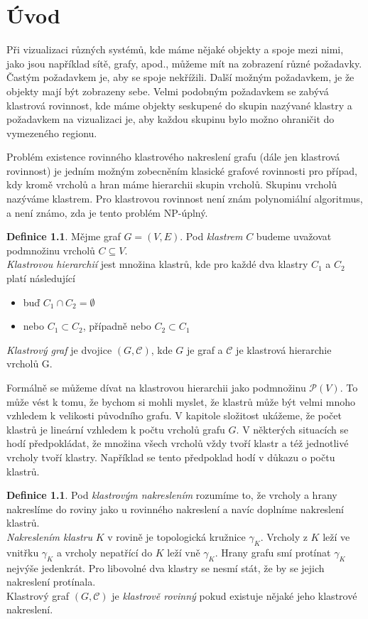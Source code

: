 \documentclass[12pt,a4report]{report}
\theoremstyle{definition}
\newtheorem{defn}[theorem]{Definice}
\begin{document}
\author{Filip Šedivý}

\chapter{Úvod}

Při vizualizaci různých systémů, kde máme nějaké objekty a spoje mezi nimi, jako jsou například sítě, grafy, apod., můžeme mít na zobrazení různé požadavky. Častým požadavkem je, aby se spoje nekřížili. Další možným požadavkem, je že objekty mají být zobrazeny  sebe. Velmi podobným požadavkem se zabývá klastrová rovinnost, kde máme objekty seskupené do skupin nazývané klastry a požadavkem na vizualizaci je, aby každou skupinu bylo možno ohraničit do vymezeného regionu.

Problém existence rovinného klastrového nakreslení grafu (dále jen klastrová rovinnost) je jedním možným zobecněním klasické grafové rovinnosti pro případ, kdy kromě vrcholů a hran máme hierarchii skupin vrcholů. Skupinu vrcholů nazýváme klastrem. Pro klastrovou rovinnost není znám polynomiální algoritmus, a není známo, zda je tento problém NP-úplný. 

\begin{defn}
Mějme graf $G=(V,E)$. Pod \textit{klastrem} $C$ budeme uvažovat podmnožinu vrcholů  $C \subseteq V$. \\
\textit{Klastrovou hierarchií} jest množina klastrů, kde pro každé dva klastry $C_1$ a $C_2$ platí následující
\begin{itemize}
\item buď $C_1 \cap C_2 = \emptyset$
\item nebo $C_1 \subset C_2$, případně nebo $C_2 \subset C_1$
\end{itemize}
\textit{Klastrový graf} je dvojice $(G,\mathcal C)$, kde $G$ je graf a $\mathcal C$ je klastrová hierarchie vrcholů G.
\end{defn}

Formálně se můžeme dívat na klastrovou hierarchii jako podmnožinu $\mathcal P (V)$. To může vést k tomu, že bychom si mohli myslet, že klastrů může být velmi mnoho vzhledem k velikosti původního grafu. V kapitole složitost ukážeme, že počet klastrů je lineární vzhledem k počtu vrcholů grafu $G$. V některých situacích se hodí předpokládat, že množina všech vrcholů vždy tvoří klastr a též jednotlivé vrcholy tvoří klastry. Například se tento předpoklad  hodí v důkazu o počtu klastrů.

\begin{defn}
Pod \textit{klastrovým nakreslením} rozumíme to, že vrcholy a hrany nakreslíme do roviny jako u rovinného nakreslení a navíc doplníme nakreslení klastrů.\\ 
\textit{Nakreslením klastru} $K$ v rovině je topologická kružnice $\gamma_K$. Vrcholy z $K$ leží ve vnitřku $\gamma_K$ a vrcholy nepatřící do $K$ leží vně $\gamma_K$. Hrany grafu smí protínat $\gamma_K$ nejvýše jedenkrát. Pro libovolné dva klastry se nesmí stát, že by se jejich nakreslení protínala.\\
Klastrový graf $(G,\mathcal C)$ je \textit{klastrově rovinný} pokud existuje nějaké jeho klastrové nakreslení.
\end{defn}
\end{document}
